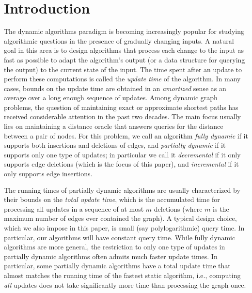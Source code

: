 \section{Introduction}
The dynamic algorithms paradigm is becoming increasingly popular for studying algorithmic questions in the presence of gradually changing inputs.
A natural goal in this area is to design algorithms that process each change to the input as fast as possible to adapt the algorithm's output (or a data structure for querying the output) to the current state of the input.
The time spent after an update to perform these computations is called the \emph{update time} of the algorithm.
In many cases, bounds on the update time are obtained in an \emph{amortized} sense as an average over a long enough sequence of updates. Among dynamic graph problems, the question of maintaining exact or approximate shortest paths has received considerable attention in the past two decades. The main focus usually lies on maintaining a distance oracle that answers queries for the distance between a pair of nodes.
For this problem, we call an algorithm \emph{fully dynamic} if it supports both insertions and deletions of edges, and \emph{partially dynamic} if it supports only one type of updates; in particular we call it \emph{decremental} if it only supports edge deletions  (which is the focus of this paper), and \emph{incremental} if it only supports edge insertions. 

The running times of partially dynamic algorithms are usually characterized by their bounds on the \emph{total update time}, which is the accumulated time for processing all updates in a sequence of at most $ m $ deletions (where $ m $ is the maximum number of edges ever contained the graph).
A typical design choice, which we also impose in this paper, is small (say polylogarithmic) query time. In particular, our algorithms will have constant query time.
While fully dynamic algorithms are more general, the restriction to only one type of updates in partially dynamic algorithms often admits much faster update times.
In particular, some partially dynamic algorithms have a total update time that almost matches the running time of the fastest static algorithm, i.e., computing \emph{all} updates does not take significantly more time than processing the graph once.

